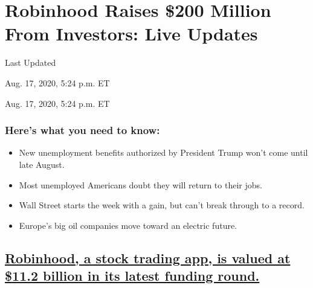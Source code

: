\hypertarget{robinhood-raises-200-million-from-investors-live-updates}{%
\section{Robinhood Raises \$200 Million From Investors: Live
Updates}\label{robinhood-raises-200-million-from-investors-live-updates}}

Last Updated

Aug. 17, 2020, 5:24 p.m. ET

Aug. 17, 2020, 5:24 p.m. ET

\hypertarget{heres-what-you-need-to-know}{%
\subsubsection{Here's what you need to
know:}\label{heres-what-you-need-to-know}}

\begin{itemize}
\item
  \protect\hyperlink{new-unemployment-benefits-authorized-by-president-trump-wont-come-until-late-august}{}

  New unemployment benefits authorized by President Trump won't come
  until late August.
\item
  \protect\hyperlink{most-unemployed-americans-doubt-they-will-return-to-their-jobs}{}

  Most unemployed Americans doubt they will return to their jobs.
\item
  \protect\hyperlink{wall-street-starts-the-week-with-a-gain-but-cant-break-through-to-a-record}{}

  Wall Street starts the week with a gain, but can't break through to a
  record.
\item
  \protect\hyperlink{europes-big-oil-companies-move-toward-an-electric-future}{}

  Europe's big oil companies move toward an electric future.
\end{itemize}

\hypertarget{robinhood-a-stock-trading-app-is-valued-at-112-billion-in-its-latest-funding-round}{%
\subsection{\texorpdfstring{\protect\hyperlink{robinhood-a-stock-trading-app-is-valued-at-11-2-billion-in-its-latest-funding-round}{Robinhood,
a stock trading app, is valued at \$11.2 billion in its latest funding
round.}}{Robinhood, a stock trading app, is valued at \$11.2 billion in its latest funding round.}}\label{robinhood-a-stock-trading-app-is-valued-at-112-billion-in-its-latest-funding-round}}

